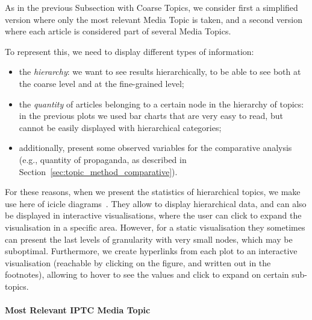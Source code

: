 






As in the previous Subsection with Coarse Topics, we consider first a simplified version where only the most relevant Media Topic is taken, and a second version where each article is considered part of several Media Topics.

To represent this, we need to display different types of information:

\begin{itemize}
    \item the \emph{hierarchy}: we want to see results hierarchically, to be able to see both at the coarse level and at the fine-grained level;
    \item the \emph{quantity} of articles belonging to a certain node in the hierarchy of topics: in the previous plots we used bar charts that are very easy to read, but cannot be easily displayed with hierarchical categories;
    \item additionally, present some observed variables for the comparative analysis (e.g., quantity of propaganda, as described in Section~\ref{sec:topic_method_comparative}).
\end{itemize}

For these reasons, when we present the statistics of hierarchical topics, we make use here of icicle diagrams~\citep{kruskal1983icicle}.
They allow to display hierarchical data, and can also be displayed in interactive visualisations, where the user can click to expand the visualisation in a specific area.
However, for a static visualisation they sometimes can present the last levels of granularity with very small nodes, which may be suboptimal.
Furthermore, we create hyperlinks from each plot to an interactive visualisation (reachable by clicking on the figure, and written out in the footnotes), allowing to hover to see the values and click to expand on certain sub-topics.

\paragraph{Most Relevant IPTC Media Topic}

